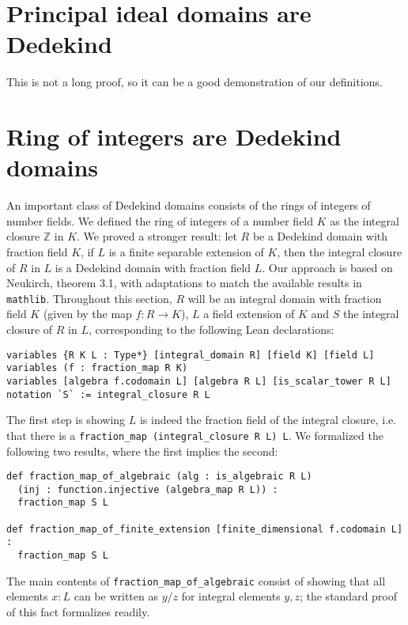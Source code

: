\documentclass{lipics-v2021}
\newcommand{\lean}[1]{\texttt{#1}\xspace} %
\newcommand{\mathlib}{\texttt{mathlib}\xspace}
\newcommand{\Z}{\mathbb{Z}}
\begin{document}
\section{Principal ideal domains are Dedekind}

This is not a long proof, so it can be a good demonstration of our definitions.

\section{Ring of integers are Dedekind domains}

An important class of Dedekind domains consists of the rings of integers of number fields.
We defined the ring of integers of a number field $K$ as the integral closure $\Z$ in $K$.
We proved a stronger result: let $R$ be a Dedekind domain with fraction field $K$, if $L$ is a finite separable extension of $K$, then the integral closure of $R$ in $L$ is a Dedekind domain with fraction field $L$.
Our approach is based on Neukirch, theorem 3.1, with adaptations to match the available results in \mathlib. %
Throughout this section, $R$ will be an integral domain with fraction field $K$ (given by the map $f : R \to K$), $L$ a field extension of $K$ and $S$ the integral closure of $R$ in $L$,
corresponding to the following Lean declarations:
\begin{lstlisting}
variables {R K L : Type*} [integral_domain R] [field K] [field L]
variables (f : fraction_map R K)
variables [algebra f.codomain L] [algebra R L] [is_scalar_tower R L]
notation `S` := integral_closure R L
\end{lstlisting}

The first step is showing $L$ is indeed the fraction field of the integral closure,
i.e. that there is a \lean{fraction\_map (integral\_closure R L) L}.
We formalized the following two results, where the first implies the second:
\begin{lstlisting}
def fraction_map_of_algebraic (alg : is_algebraic R L)
  (inj : function.injective (algebra_map R L)) :
  fraction_map S L

def fraction_map_of_finite_extension [finite_dimensional f.codomain L] :
  fraction_map S L
\end{lstlisting}
The main contents of \lean{fraction\_map\_of\_algebraic} consist of showing that all elements $x : L$ can be written as $y / z$ for integral elements $y, z$;
the standard proof of this fact formalizes readily. %
\end{document}
